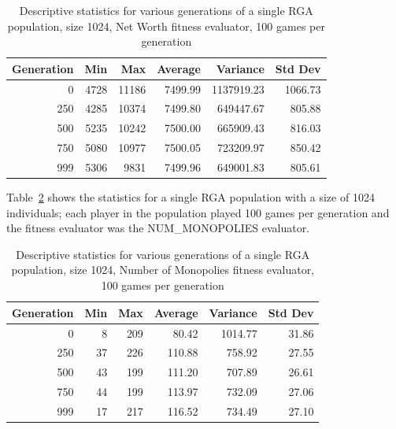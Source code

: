 \begin{table}[ht]
\begin{center}
\begin{tabular}{ | r || r | r | r | r | r |}
\hline                        
Generation & Min & Max & Average & Variance & Std Dev \\ \hline \hline
0   & 4728 & 11186 & 7499.99 & 1137919.23 & 1066.73 \\ \hline
250 & 4285 & 10374 & 7499.80 &  649447.67 &  805.88 \\ \hline
500 & 5235 & 10242 & 7500.00 &  665909.43 &  816.03 \\ \hline
750 & 5080 & 10977 & 7500.05 &  723209.97 &  850.42 \\ \hline
999 & 5306 &  9831 & 7499.96 &  649001.83 &  805.61 \\ \hline
\end{tabular}
\caption[RGA, Net Worth, statistics]{Descriptive statistics for various
generations of a single RGA population, size 1024, Net Worth fitness evaluator,
100 games per generation}
\label{table-stats-for-s1024-n100-netw}
\end{center}
\end{table}

Table~\ref{table-stats-for-s1024-n100-nm} shows the statistics for a single
RGA population with a size of 1024 individuals; each player in the population
played 100 games per generation and the fitness evaluator was the NUM\_MONOPOLIES
evaluator.

\begin{table}[ht]
\begin{center}
\begin{tabular}{ | r || r | r | r | r | r |}
\hline                        
Generation & Min & Max & Average & Variance & Std Dev \\ \hline \hline
0   &  8 & 209 &  80.42 & 1014.77 & 31.86 \\ \hline
250 & 37 & 226 & 110.88 &  758.92 & 27.55 \\ \hline 
500 & 43 & 199 & 111.20 &  707.89 & 26.61 \\ \hline
750 & 44 & 199 & 113.97 &  732.09 & 27.06 \\ \hline
999 & 17 & 217 & 116.52 &  734.49 & 27.10 \\ \hline
\end{tabular}
\caption[RGA, Number of Monopolies, statistics]{Descriptive statistics for
various generations of a single RGA population, size 1024, Number of Monopolies fitness
evaluator, 100 games per generation}
\label{table-stats-for-s1024-n100-nm}
\end{center}
\end{table}

